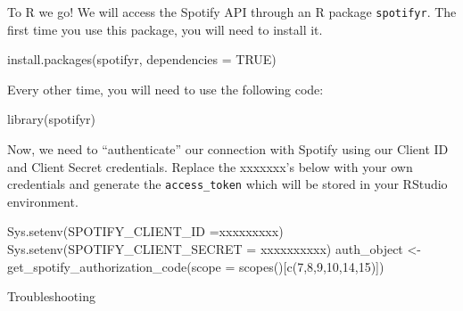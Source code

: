 \documentclass[
  letterpaper,
  DIV=11,
  numbers=noendperiod]{scrreprt}
\newenvironment{Shaded}{\begin{snugshade}}{\end{snugshade}}
\newcommand{\AttributeTok}[1]{\textcolor[rgb]{0.40,0.45,0.13}{#1}}
\newcommand{\ConstantTok}[1]{\textcolor[rgb]{0.56,0.35,0.01}{#1}}
\newcommand{\DecValTok}[1]{\textcolor[rgb]{0.68,0.00,0.00}{#1}}
\newcommand{\FunctionTok}[1]{\textcolor[rgb]{0.28,0.35,0.67}{#1}}
\newcommand{\NormalTok}[1]{\textcolor[rgb]{0.00,0.23,0.31}{#1}}
\newcommand{\OtherTok}[1]{\textcolor[rgb]{0.00,0.23,0.31}{#1}}
\newcommand{\StringTok}[1]{\textcolor[rgb]{0.13,0.47,0.30}{#1}}
\begin{document}
To R we go! We will access the Spotify API through an R package
\texttt{spotifyr}. The first time you use this package, you will need to
install it.

\begin{Shaded}
\begin{Highlighting}[]
\FunctionTok{install.packages}\NormalTok{(}\StringTok{\textquotesingle{}spotifyr\textquotesingle{}}\NormalTok{, }\AttributeTok{dependencies =} \ConstantTok{TRUE}\NormalTok{)}
\end{Highlighting}
\end{Shaded}

Every other time, you will need to use the following code:

\begin{Shaded}
\begin{Highlighting}[]
\FunctionTok{library}\NormalTok{(spotifyr)}
\end{Highlighting}
\end{Shaded}

Now, we need to ``authenticate'' our connection with Spotify using our
Client ID and Client Secret credentials. Replace the xxxxxxx's below
with your own credentials and generate the \texttt{access\_token} which
will be stored in your RStudio environment.

\begin{Shaded}
\begin{Highlighting}[]
\FunctionTok{Sys.setenv}\NormalTok{(}\AttributeTok{SPOTIFY\_CLIENT\_ID =}\StringTok{\textquotesingle{}xxxxxxxxx\textquotesingle{}}\NormalTok{)}
\FunctionTok{Sys.setenv}\NormalTok{(}\AttributeTok{SPOTIFY\_CLIENT\_SECRET =} \StringTok{\textquotesingle{}xxxxxxxxxx\textquotesingle{}}\NormalTok{)}
\NormalTok{auth\_object }\OtherTok{\textless{}{-}} \FunctionTok{get\_spotify\_authorization\_code}\NormalTok{(}\AttributeTok{scope =} \FunctionTok{scopes}\NormalTok{()[}\FunctionTok{c}\NormalTok{(}\DecValTok{7}\NormalTok{,}\DecValTok{8}\NormalTok{,}\DecValTok{9}\NormalTok{,}\DecValTok{10}\NormalTok{,}\DecValTok{14}\NormalTok{,}\DecValTok{15}\NormalTok{)])}
\end{Highlighting}
\end{Shaded}

Troubleshooting
\end{document}
